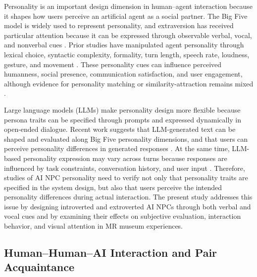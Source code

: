 \documentclass[a4paper,fleqn]{cas-sc}
\begin{document}
Personality is an important design dimension in human--agent interaction because it shapes how users perceive an artificial agent as a social partner. The Big Five model is widely used to represent personality, and extraversion has received particular attention because it can be expressed through observable verbal, vocal, and nonverbal cues \citep{johnBigFiveInventory1991,
gillTakingCareLinguistic2002, neffEvaluatingEffectGesture2010,
ahmadFrameworkPersonalityCues2022}. Prior studies have manipulated agent personality through lexical choice, syntactic complexity, formality, turn length, speech rate, loudness, gesture, and movement
\citep{neffEvaluatingEffectGesture2010, ahmadCommunicatingMachinesConversational2021,
jinBirdsFeatherFlock2023, zeddaOlderAdultsUser2025}. These personality cues can influence perceived humanness, social presence, communication satisfaction, and user engagement, although evidence for personality matching or similarity-attraction remains mixed
\citep{leeCanRobotsManifest2006, ahmadCommunicatingMachinesConversational2021,
volkelUserPerceptionsExtraversion2022, jinBirdsFeatherFlock2023}.

Large language models (LLMs) make personality design more flexible because persona traits can be specified through prompts and expressed dynamically in open-ended dialogue. Recent work suggests that LLM-generated text can be shaped and evaluated along Big Five personality dimensions, and that users can perceive personality differences in generated responses
\citep{serapio-garciaPersonalityTraitsLarge2023,
jiangPersonaLLMInvestigatingAbility2024}. At the same time, LLM-based
personality expression may vary across turns because responses are influenced by task constraints, conversation history, and user input \citep{frischLLMAgentsInteraction2024}. Therefore, studies of AI NPC personality need to verify not only that personality traits are specified in the system design, but also that users perceive the intended personality differences during actual interaction. The present study addresses this issue by designing introverted and extroverted AI NPCs through both verbal and vocal cues and by examining their effects on subjective evaluation, interaction behavior, and visual attention in MR museum experiences.

\subsection{Human--Human--AI Interaction and Pair Acquaintance}
\end{document}
